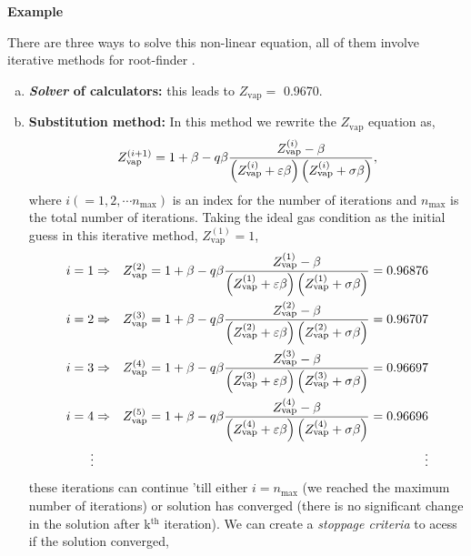\begin{MyExample}{\begin{center}{\bf Example}\end{center}}
           There are three ways to solve this non-linear equation, all of them involve iterative methods for root-finder \citep[for more information about root-finder methods see Appendix~\ref{Section:RootFinderMethods} and/or][]{Atkinson_Book_Newton,NumericalRecipes_Newton}.
           \begin{enumerate}[a)]
%
              \item {\bf {\it Solver} of calculators:} this leads to $Z_{\text{vap}} = $ 0.9670. 
%
              \item {\bf Substitution method:} In this method we rewrite the $Z_{\text{vap}}$ equation as,
                 \begin{displaymath}
                     Z_{\text{vap}}^{(i+1)} = 1 + \beta - q\beta \displaystyle\frac{Z_{\text{vap}}^{(i)} - \beta} {\left(Z_{\text{vap}}^{(i)}+\varepsilon\beta\right)\left(Z_{\text{vap}}^{(i)} +\sigma\beta\right)},
                 \end{displaymath}
                 where $i(=1, 2, \cdots n_{\text{max}})$ is an index for the number of iterations and $n_{\text{max}}$ is the total number of iterations. Taking the ideal gas condition as the initial guess in this iterative method, \ie $Z_{\text{vap}}^{(1)}=1$, 
                 \begin{eqnarray}
                    i=1 &\Rightarrow& Z_{\text{vap}}^{(2)} = 1 + \beta - q\beta \displaystyle\frac{Z_{\text{vap}}^{(1)} - \beta} {\left(Z_{\text{vap}}^{(1)}+\varepsilon\beta\right)\left(Z_{\text{vap}}^{(1)} +\sigma\beta\right)} = 0.96876 \nonumber \\
                    i=2 &\Rightarrow& Z_{\text{vap}}^{(3)} = 1 + \beta - q\beta \displaystyle\frac{Z_{\text{vap}}^{(2)} - \beta} {\left(Z_{\text{vap}}^{(2)}+\varepsilon\beta\right)\left(Z_{\text{vap}}^{(2)} +\sigma\beta\right)} = 0.96707 \nonumber \\
                    i=3 &\Rightarrow& Z_{\text{vap}}^{(4)} = 1 + \beta - q\beta \displaystyle\frac{Z_{\text{vap}}^{(3)} - \beta} {\left(Z_{\text{vap}}^{(3)}+\varepsilon\beta\right)\left(Z_{\text{vap}}^{(3)} +\sigma\beta\right)} = 0.96697 \nonumber \\
                    i=4 &\Rightarrow& Z_{\text{vap}}^{(5)} = 1 + \beta - q\beta \displaystyle\frac{Z_{\text{vap}}^{(4)} - \beta} {\left(Z_{\text{vap}}^{(4)}+\varepsilon\beta\right)\left(Z_{\text{vap}}^{(4)} +\sigma\beta\right)} = 0.96696 \nonumber \\
                    \vdots && \vdots \nonumber
                 \end{eqnarray}
                 these iterations can continue 'till either $i=n_{\text{max}}$ (\ie we reached the maximum number of iterations) or solution has converged (\ie there is no significant change in the solution after k$^{\text{th}}$ iteration). We can create a {\it stoppage criteria} to acess if the solution converged,

\end{enumerate}
\end{MyExample}
